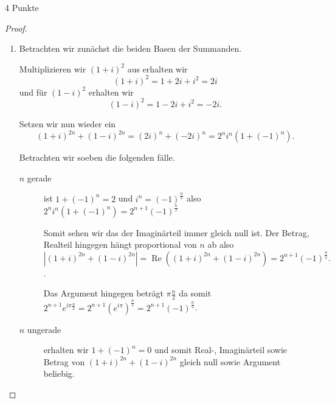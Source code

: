 \documentclass{problemset}
\begin{document}
\begin{problem}{4 Punkte}
\begin{proof}
\begin{enumerate}
        \item Betrachten wir zunächst die beiden Basen der Summanden.

              Multiplizieren wir ${(1 + i)}^2$ aus erhalten wir \[
                  {(1 + i)}^2 = 1 + 2i + i^2 = 2i
              \] und für ${(1 - i)}^2$ erhalten wir \[
                  {(1 - i)}^2 = 1 - 2i + i^2 = -2i.
              \]

              Setzen wir nun wieder ein
              \[
                  (1 + i)^{2n} + (1 - i)^{2n} = {(2i)}^n + {(-2i)}^n = 2^ni^n(1+ {(-1)}^n).
              \]

              Betrachten wir soeben die folgenden fälle.

              \begin{description}
                  \item[$n$ gerade]
                        ist $1+ {(-1)}^n = 2$ und $i^n = {(-1)}^\frac{n}{2}$ also $2^ni^n(1+ {(-1)}^n) = 2^{n+1}{(-1)}^{\frac{n}{2}}$

                        Somit sehen wir das der Imaginärteil immer gleich null ist. Der Betrag,
                        Realteil hingegen hängt proportional von $n$ ab also \[
                            |(1 + i)^{2n} + (1 - i)^{2n}|  = \operatorname{Re}((1 + i)^{2n} + (1 - i)^{2n}) = 2^{n+1}{(-1)}^{\frac{n}{2}}.
                        \].

                        Das Argument hingegen beträgt $\pi \frac{n}{2}$ da somit $2^{n+1}
                            e^{i\pi\frac{n}{2}} = 2^{n+1} {(e^{i\pi})}^\frac{n}{2} =
                            2^{n+1}{(-1)}^{\frac{n}{2}}$.

                  \item[$n$ ungerade]
                        erhalten wir $1+ {(-1)}^n = 0$ und somit Real-, Imaginärteil sowie Betrag von $(1 + i)^{2n} + (1 - i)^{2n}$ gleich
                        null sowie Argument beliebig.
              \end{description}

              \begin{center}
\end{center}
\end{enumerate}
\end{proof}
\end{problem}
\end{document}
